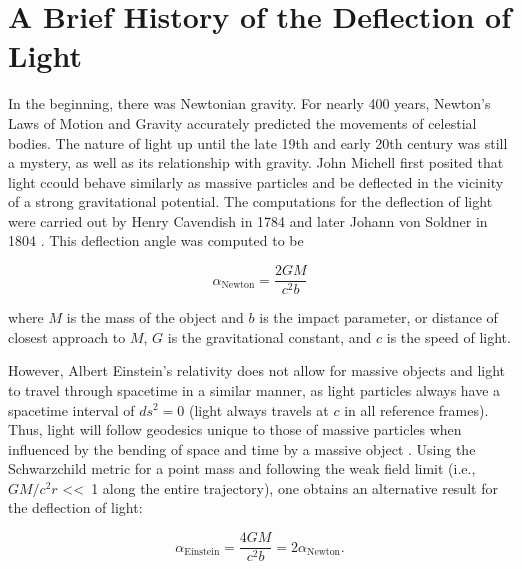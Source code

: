 \section{A Brief History of the Deflection of Light}

In the beginning, there was Newtonian gravity. For nearly 400 years, Newton's Laws of Motion and Gravity accurately predicted the movements of celestial bodies. The nature of light up until the late 19th and early 20th century was still a mystery, as well as its relationship with gravity. John Michell first posited that light ccould behave similarly as massive particles and be deflected in the vicinity of a strong gravitational potential. The computations for the deflection of light were carried out by Henry Cavendish in 1784 \citep{Cavendish:2011ts} and later Johann von Soldner in 1804 \citep{Jaki:1978wc}. This deflection angle was computed to be

\begin{equation}
\alpha_\mathrm{Newton} = \frac{2GM}{c^2b}
\end{equation}

\noindent where $M$ is the mass of the object and $b$ is the impact parameter, or distance of closest approach to $M$, $G$ is the gravitational constant, and $c$ is the speed of light.

However, Albert Einstein's relativity does not allow for massive objects and light to travel through spacetime in a similar manner, as light particles always have a spacetime interval of $ds^2=0$ (light always travels at $c$ in all reference frames). Thus, light will follow geodesics unique to those of massive particles when influenced by the bending of space and time by a massive object \citep{Einstein:1911rf}. Using the Schwarzchild metric for a point mass and following the weak field limit (i.e., $GM/c^2r$ \textless \textless\ 1 along the entire trajectory), one obtains an alternative result for the deflection of light:

\begin{equation}
\alpha_\mathrm{Einstein} = \frac{4GM}{c^2b} =  2\alpha_\mathrm{Newton}.
\label{intro:eqn:deflection}
\end{equation}

